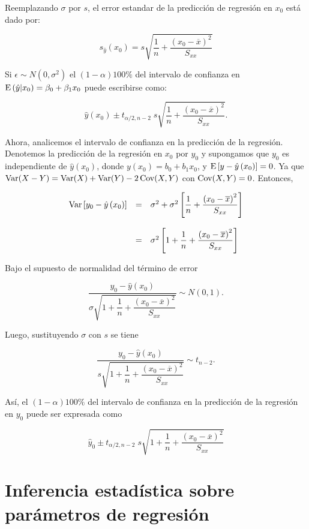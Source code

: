 Reemplazando $\sigma$ por $s$, el error estandar de la predicción de regresión en $x_0$ está dado por:

$$s_{\hat{y}}\left(x_0\right)=s\sqrt{\dfrac{1}{n}+\dfrac{\left(x_0-\overline{x}\right)^2}{S_{xx}}}$$

Si $\epsilon\sim N\left(0, \sigma^2\right)$ el $(1-\alpha)100\%$ del intervalo de confianza en $\mathop{\mbox{\normalfont E}}\nolimits\left(\hat{y}|x_0\right)=\beta_0+\beta_1x_0$ puede escribirse como:


$$\hat{y}\left(x_0\right)\pm t_{\alpha/2,n-2}\;s\sqrt{\dfrac{1}{n}+\dfrac{\left(x_0-\overline{x}\right)^2}{S_{xx}}}.$$

Ahora, analicemos el intervalo de confianza en la predicción de la regresión. Denotemos la predicción de la regresión en $x_0$ por $y_0$ y supongamos que $y_0$ es independiente de $\hat{y}\left(x_0\right)$, donde $y\left(x_0\right)=b_0+b_1x_0$, y $\mathop{\mbox{\normalfont E}}\nolimits\left[y-\hat{y}\left(x_0\right)\right]=0$. Ya que $\mathop{\mbox{\normalfont Var}}\nolimits(X-Y)=\mathop{\mbox{\normalfont Var}}\nolimits(X)+\mathop{\mbox{\normalfont Var}}\nolimits(Y)-2\mathop{\mbox{\normalfont Cov}}\nolimits(X,Y)$ con $\mathop{\mbox{\normalfont Cov}}\nolimits(X,Y)=0$. Entonces,

$$
\begin{array}{rcl}
    \mathop{\mbox{\normalfont Var}}\nolimits\left[y_0-\hat{y}\left(x_0\right)\right] &=& \sigma^2+\sigma^2\left[\dfrac{1}{n}+\dfrac{\left(x_0-\overline{x}\right)^2}{S_{xx}}\right]\\\\
						 &=& \sigma^2\left[1+\dfrac{1}{n}+\dfrac{\left(x_0-\overline{x}\right)^2}{S_{xx}}\right]
\end{array}
$$

Bajo el supuesto de normalidad del término de error

$$\dfrac{y_0-\hat{y}\left(x_0\right)}{\sigma\sqrt{1+\dfrac{1}{n}+\dfrac{\left(x_0-\overline{x}\right)^2}{S_{xx}}}}\sim N(0,1).$$

Luego, sustituyendo $\sigma$ con $s$ se tiene

$$\dfrac{y_0-\hat{y}\left(x_0\right)}{s\sqrt{1+\dfrac{1}{n}+\dfrac{\left(x_0-\overline{x}\right)^2}{S_{xx}}}}\sim t_{n-2}.$$

Así, el $(1-\alpha)100\%$ del intervalo de confianza en la predicción de la regresión en $y_0$ puede ser expresada como

$$\hat{y}_0\pm t_{\alpha/2,n-2}\; s \sqrt{1+\dfrac{1}{n}+\dfrac{\left(x_0-\overline{x}\right)^2}{S_{xx}}}$$


\section{Inferencia estadística sobre parámetros de regresión}

